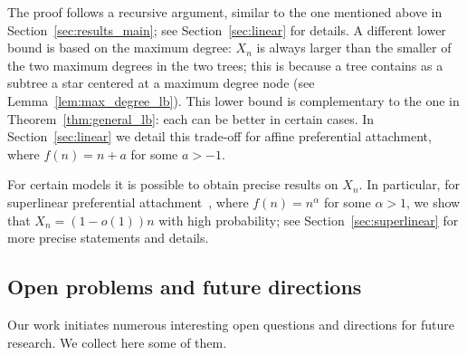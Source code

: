 \documentclass[11pt]{article}
\numberwithin{equation}{section}
\theoremstyle{definition}
\begin{document}
The proof follows a recursive argument, similar to the one mentioned above in Section~\ref{sec:results_main}; 
see Section~\ref{sec:linear} for details. 
A different lower bound is based on the maximum degree: 
$X_{n}$ is always larger than the smaller of the two maximum degrees in the two trees; 
this is because a tree contains as a subtree a star centered at a maximum degree node (see Lemma~\ref{lem:max_degree_lb}). 
This lower bound is complementary to the one in Theorem~\ref{thm:general_lb}: each can be better in certain cases. 
In Section~\ref{sec:linear} we detail this trade-off for affine preferential attachment, where $f(n) = n + a$ for some $a > -1$. 


For certain models it is possible to obtain precise results on $X_{n}$. 
In particular, for superlinear preferential attachment~\cite{oliveira2005connectivity}, where $f(n) = n^{\alpha}$ for some $\alpha > 1$, 
we show that $X_{n} = (1-o(1))n$ with high probability; 
see Section~\ref{sec:superlinear} for more precise statements and details. 


\subsection{Open problems and future directions} \label{sec:open}

Our work initiates numerous interesting open questions and directions for future research. We collect here some of them.
\end{document}
